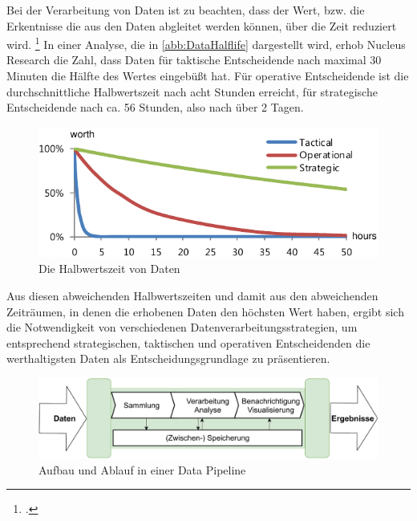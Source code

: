 
Bei der Verarbeitung von Daten ist zu beachten, dass der Wert, bzw. die Erkentnisse die aus den Daten abgleitet werden können, über die Zeit reduziert wird. \footcite[Vgl. auch im Folgenden][]{NucleusResarchInc..2012} In einer Analyse, die in \autoref{abb:DataHalflife} dargestellt wird, erhob Nucleus Research die Zahl, dass Daten für taktische Entscheidende nach maximal 30 Minuten die Hälfte des Wertes eingebüßt hat. Für operative Entscheidende ist die durchschnittliche Halbwertszeit nach acht Stunden erreicht, für strategische Entscheidende nach ca. 56 Stunden, also nach über 2 Tagen.
\begin{figure}[H]
\centering
\includegraphics[width=\textwidth]{graphics/half-life-data.pdf}
\caption[Die Halbwertszeit von Daten]{Die Halbwertszeit von Daten\footnotemark}
\label{abb:DataHalflife}
\end{figure}
Aus diesen abweichenden Halbwertszeiten und damit aus den abweichenden Zeiträumen, in denen die erhobenen Daten den höchsten Wert haben, ergibt sich die Notwendigkeit von verschiedenen Datenverarbeitungsstrategien, um entsprechend strategischen, taktischen und operativen Entscheidenden die werthaltigsten Daten als Entscheidungsgrundlage zu präsentieren.



\begin{figure}[H]
\centering
\includegraphics[width=\textwidth]{graphics/DataPipeline.pdf}
\caption{Aufbau und Ablauf in einer Data Pipeline}
\label{abb:DataPipeline}
\end{figure}


